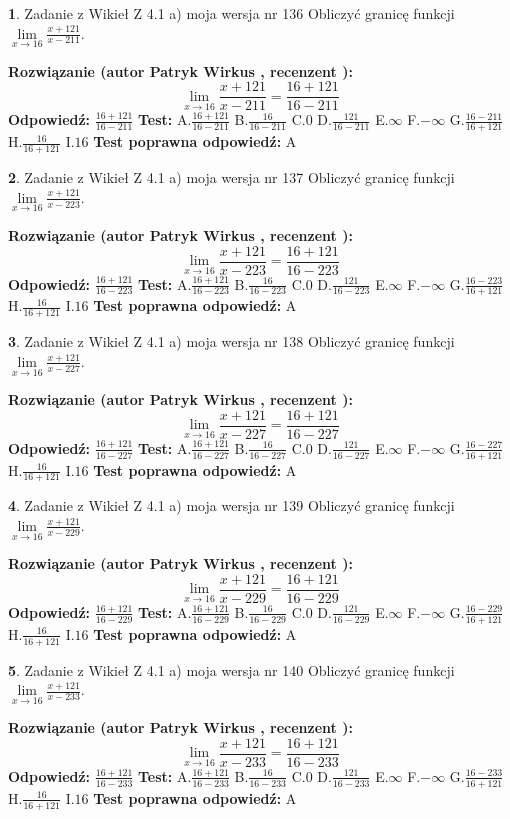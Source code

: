 \documentclass[12pt, a4paper]{article}
\theoremstyle{definition} %
\newtheorem{zad}{}
\newcommand{\zadStart}[1]{\begin{zad}#1\newline}
\newcommand{\zadStop}{\end{zad}}
\newcommand{\rozwStart}[2]{\noindent \textbf{Rozwiązanie (autor #1 , recenzent #2): }\newline}
\newcommand{\rozwStop}{\newline}
\newcommand{\odpStart}{\noindent \textbf{Odpowiedź:}\newline}
\newcommand{\odpStop}{\newline}
\newcommand{\testStart}{\noindent \textbf{Test:}\newline}
\newcommand{\testStop}{\newline}
\newcommand{\kluczStart}{\noindent \textbf{Test poprawna odpowiedź:}\newline}
\newcommand{\kluczStop}{\newline}
\begin{document}
\zadStart{Zadanie z Wikieł Z 4.1 a) moja wersja nr 136}
Obliczyć granicę funkcji $\lim\limits_{x\to16}\frac{x+121}{x-211}$.
\zadStop
\rozwStart{Patryk Wirkus}{}
$$\lim\limits_{x\to16}\frac{x+121}{x-211} = \frac{16+121}{16-211}$$
\rozwStop
\odpStart
$\frac{16+121}{16-211}$
\odpStop
\testStart
A.$\frac{16+121}{16-211}$
B.$\frac{16}{16-211}$
C.$0$
D.$\frac{121}{16-211}$
E.$\infty$
F.$-\infty$
G.$\frac{16-211}{16+121}$
H.$\frac{16}{16+121}$
I.$16$
\testStop
\kluczStart
A
\kluczStop



\zadStart{Zadanie z Wikieł Z 4.1 a) moja wersja nr 137}
Obliczyć granicę funkcji $\lim\limits_{x\to16}\frac{x+121}{x-223}$.
\zadStop
\rozwStart{Patryk Wirkus}{}
$$\lim\limits_{x\to16}\frac{x+121}{x-223} = \frac{16+121}{16-223}$$
\rozwStop
\odpStart
$\frac{16+121}{16-223}$
\odpStop
\testStart
A.$\frac{16+121}{16-223}$
B.$\frac{16}{16-223}$
C.$0$
D.$\frac{121}{16-223}$
E.$\infty$
F.$-\infty$
G.$\frac{16-223}{16+121}$
H.$\frac{16}{16+121}$
I.$16$
\testStop
\kluczStart
A
\kluczStop



\zadStart{Zadanie z Wikieł Z 4.1 a) moja wersja nr 138}
Obliczyć granicę funkcji $\lim\limits_{x\to16}\frac{x+121}{x-227}$.
\zadStop
\rozwStart{Patryk Wirkus}{}
$$\lim\limits_{x\to16}\frac{x+121}{x-227} = \frac{16+121}{16-227}$$
\rozwStop
\odpStart
$\frac{16+121}{16-227}$
\odpStop
\testStart
A.$\frac{16+121}{16-227}$
B.$\frac{16}{16-227}$
C.$0$
D.$\frac{121}{16-227}$
E.$\infty$
F.$-\infty$
G.$\frac{16-227}{16+121}$
H.$\frac{16}{16+121}$
I.$16$
\testStop
\kluczStart
A
\kluczStop



\zadStart{Zadanie z Wikieł Z 4.1 a) moja wersja nr 139}
Obliczyć granicę funkcji $\lim\limits_{x\to16}\frac{x+121}{x-229}$.
\zadStop
\rozwStart{Patryk Wirkus}{}
$$\lim\limits_{x\to16}\frac{x+121}{x-229} = \frac{16+121}{16-229}$$
\rozwStop
\odpStart
$\frac{16+121}{16-229}$
\odpStop
\testStart
A.$\frac{16+121}{16-229}$
B.$\frac{16}{16-229}$
C.$0$
D.$\frac{121}{16-229}$
E.$\infty$
F.$-\infty$
G.$\frac{16-229}{16+121}$
H.$\frac{16}{16+121}$
I.$16$
\testStop
\kluczStart
A
\kluczStop



\zadStart{Zadanie z Wikieł Z 4.1 a) moja wersja nr 140}
Obliczyć granicę funkcji $\lim\limits_{x\to16}\frac{x+121}{x-233}$.
\zadStop
\rozwStart{Patryk Wirkus}{}
$$\lim\limits_{x\to16}\frac{x+121}{x-233} = \frac{16+121}{16-233}$$
\rozwStop
\odpStart
$\frac{16+121}{16-233}$
\odpStop
\testStart
A.$\frac{16+121}{16-233}$
B.$\frac{16}{16-233}$
C.$0$
D.$\frac{121}{16-233}$
E.$\infty$
F.$-\infty$
G.$\frac{16-233}{16+121}$
H.$\frac{16}{16+121}$
I.$16$
\testStop
\kluczStart
A
\kluczStop
\end{document}
